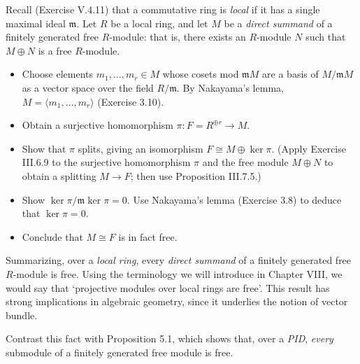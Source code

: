 \documentclass[../../master.tex]{subfiles}
\begin{document}
\begin{problem}
    Recall (Exercise V.4.11) that a commutative ring is \textit{local} if it has a single maximal ideal $\mathfrak{m}$.
    Let $R$ be a local ring, and let $M$ be a \textit{direct summand} of a finitely generated free $R$-module:
    that is, there exists an $R$-module $N$ such that $M \oplus N$ is a free $R$-module.
    \begin{itemize}
        \item Choose elements $m_1, \ldots, m_r \in M$ whose cosets mod $\mathfrak{m}M$ are a basis of $M/\mathfrak{m}M$ as a vector space over the field $R/\mathfrak{m}$.
            By Nakayama's lemma, $M = \langle m_1, \ldots, m_r \rangle$ (Exercise 3.10).
        \item Obtain a surjective homomorphism $\pi : F = R^{\oplus r} \to M$.
        \item Show that $\pi$ splits, giving an isomorphism $F \cong M \oplus \ker \pi$.
            (Apply Exercise III.6.9 to the surjective homomorphism $\pi$ and the free module $M \oplus N$ to obtain a splitting $M \to F$;
            then use Proposition III.7.5.)
        \item Show $\ker \pi / \mathfrak{m} \ker \pi = 0$.
            Use Nakayama's lemma (Exercise 3.8) to deduce that $\ker \pi = 0$.
        \item Conclude that $M \cong F$ is in fact free.
    \end{itemize}

    Summarizing, over a \textit{local ring}, every \textit{direct summand} of a finitely generated free $R$-module is free.
    Using the terminology we will introduce in Chapter VIII, we would say that `projective modules over local rings are free'.
    This result has strong implications in algebraic geometry, since it underlies the notion of vector bundle.

    Contrast this fact with Proposition 5.1, which shows that, over a \textit{PID}, \textit{every} submodule of a finitely generated free module is free.
\end{problem}
\end{document}
